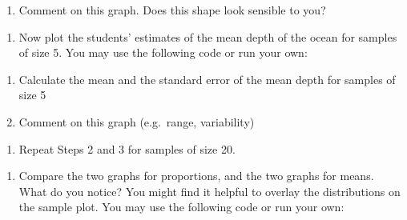 \documentclass[letterpaper,10pt,twoside,]{pinp}
\providecommand{\tightlist}{%
  \setlength{\itemsep}{0pt}\setlength{\parskip}{0pt}}
\begin{document}
\begin{enumerate}
\def\labelenumi{\alph{enumi})}
\tightlist
\item
  Comment on this graph. Does this shape look sensible to you?
\end{enumerate}

\begin{enumerate}
\def\labelenumi{\arabic{enumi}.}
\setcounter{enumi}{2}
\tightlist
\item
  Now plot the students' estimates of the mean depth of the ocean for
  samples of size 5. You may use the following code or run your own:
\end{enumerate}

\begin{Shaded}
\begin{Highlighting}[]
\StringTok{ }\NormalTok{(}\NormalTok{,}\NormalTok{,}\NormalTok{)}
\NormalTok{(water_results[,}\NormalTok{], }
      \NormalTok{(}\NormalTok{,}\NormalTok{),}
      \NormalTok{(}\OperatorTok{/}\NormalTok{), }
      \NormalTok{,}
      \NormalTok{)}
\end{Highlighting}
\end{Shaded}

\begin{enumerate}
\def\labelenumi{\alph{enumi})}
\tightlist
\item
  Calculate the mean and the standard error of the mean depth for
  samples of size 5
\item
  Comment on this graph (e.g.~range, variability)
\end{enumerate}

\begin{enumerate}
\def\labelenumi{\arabic{enumi}.}
\setcounter{enumi}{3}
\tightlist
\item
  Repeat Steps 2 and 3 for samples of size 20.
\end{enumerate}

\begin{enumerate}
\def\labelenumi{\alph{enumi})}
\tightlist
\item
  Compare the two graphs for proportions, and the two graphs for means.
  What do you notice? You might find it helpful to overlay the
  distributions on the sample plot. You may use the following code or
  run your own:
\end{enumerate}
\end{document}
